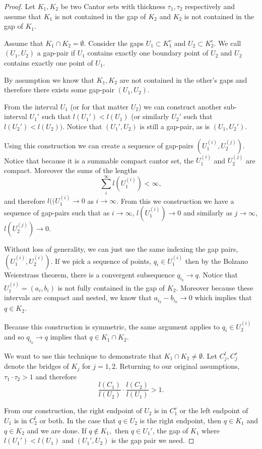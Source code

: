 \begin{proof}
    Let $K_1, K_2$ be two Cantor sets with thickness $\tau_1, \tau_2$ respectively and assume that $K_1$ is not contained in the gap of $K_2$ and $K_2$ is not contained in the gap of $K_1$.  

    Assume that $K_1 \cap K_2 = \emptyset$.  Consider the gaps $U_1 \subset K_1^c$ and $U_2 \subset K_2^c$.  We call $(U_1, U_2)$ a gap-pair if $U_1$ contains exactly one boundary point of $U_2$ and $U_2$ contains exactly one point of $U_1$.  

    By assumption we know that $K_1, K_2$ are not contained in the other's gaps and therefore there exists some gap-pair $(U_1, U_2).$

    From the interval $U_1$ (or for that matter $U_2$) we can construct another sub-interval $U_1'$ such that $l(U_1') < l(U_1)$ (or similarly $U_2'$ such that $l(U_2')<l(U_2)).$  Notice that $(U_1',U_2)$ is still a gap-pair, as is $(U_1,U_2')$.
    
    Using this construction we can create a sequence of gap-pairs $(U_1^{(i)}, U_2^{(j)})$.  Notice that because it is a summable compact cantor set, the $U_1^{(i)}$ and $U_2^{(j)}$ are compact.  Moreover the sums of the lengths $$\sum_i^\infty l(U_1^{(i)}) < \infty,$$ and therefore $l((U_1^{(i)} \to 0$ as $i \to \infty$.   From this we construction we have a sequence of gap-pairs such that as $i \to \infty$, $l(U_1^{(i)}) \to 0$ and similarly as $j \to \infty$, $l(U_2^{(j)}) \to 0$.  
    
    Without loss of generality, we can just use the same indexing the gap pairs, $(U_1^{(i)}, U_2^{(i)})$.  If we pick a sequence of points, $q_{i} \in U_1^{(i)}$ then by the Bolzano Weierstrass theorem, there is a convergent subsequence $q_{i_k} \to q$.  Notice that $U_1^{(i)} = (a_i, b_i)$ is not fully contained in the gap of $K_2$.  Moreover because these intervals are compact and nested, we know that $a_{i_k} - b_{i_k} \to 0$ which implies that $q \in K_2$.  

    Because this construction is symmetric, the same argument applies to $q_{i} \in U_2^{(i)}$ and so $q_{i_k} \to q$ implies that $q \in K_1 \cap K_2$.  

    We want to use this technique to demonstrate that $K_1 \cap K_2 \neq \emptyset.$ Let $C_j^l, C_j^r$ denote the bridges of $K_j$ for $j = 1,2$.  Returning to our original assumptions, $\tau_1 \cdot \tau_2 > 1$ and therefore $$\frac{l(C_1)}{l(U_2)} \cdot \frac{l(C_2)}{l(U_1)} > 1.$$  
    
    From our construction, the right endpoint of $U_2$ is in $C_1^r$ or the left endpoint of $U_1$ is in $C_2^l$ or both.  
    In the case that $q \in U_2$ is the right endpoint, then $q \in K_1$ and $q \in K_2$ and we are done.  
    If $q \not\in K_1,$ then $q \in U_1'$, the gap of $K_1$ where $l(U_1') < l(U_1)$ and $(U_1', U_2)$ is the gap pair we need.  

\end{proof}